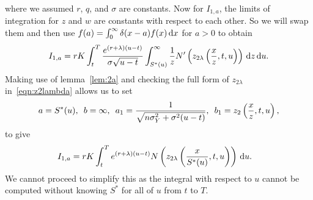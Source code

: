         		where we assumed $r$, $q$, and $\sigma$ are constants. Now for $I_{1,a}$, the limits of integration for $z$ and $w$ are constants with respect to each other. So we will swap them and then use $f(a) = \int_0^\infty \delta(x-a) f(x) \, \mathrm d x$ for $a > 0$ to obtain
        		$$
        			I_{1,a} = rK\int_t^T \frac{e^{(r+\lambda)(u-t)}}{\sigma\sqrt{u-t}}\int_{S^*(u)}^\infty \frac{1}{z} N'\left( z_{2\lambda}\left( \frac{x}{z}, t, u \right) \right) \, \mathrm d z \, \mathrm d u.
        		$$
		Making use of lemma~\ref{lem:2a} and checking the full form of $z_{2\lambda}$ in~\eqref{eqn:z2lambda} allows us to set
			$$
				a = S^*(u), \enskip b = \infty, \enskip a_1 = \frac{1}{\sqrt{n\sigma_Y^2 + \sigma^2(u-t)}}, \enskip
			b_1 = z_2\left( \frac{x}{z}, t, u \right),
			$$
		to give
			\begin{align*}
				I_{1,a} &=  rK\int_t^T e^{(r+\lambda)(u-t)}N\left(z_{2\lambda}\left( \frac{x}{S^*(u)},t,u\right) \right) \, \mathrm d u.
			\end{align*}
		We cannot proceed to simplify this as the integral with respect to $u$ cannot be computed without knowing $S^*$ for all of $u$ from $t$ to $T$.
		

